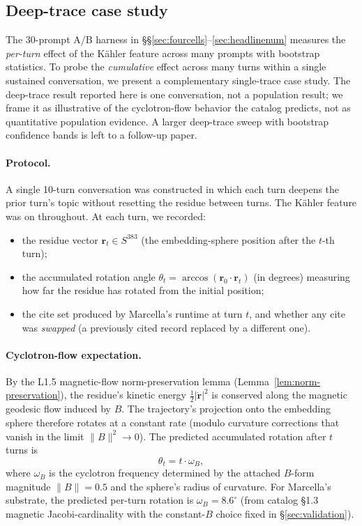 \documentclass[11pt,letterpaper]{article}
\begin{document}
\subsection{Deep-trace case study}
\label{sec:deeptrace}

The 30-prompt A/B harness in
\S\S\ref{sec:fourcells}--\ref{sec:headlinenum} measures the
\emph{per-turn} effect of the K\"ahler feature across many prompts
with bootstrap statistics. To probe the \emph{cumulative}
effect across many turns within a single sustained conversation,
we present a complementary single-trace case study. The deep-trace
result reported here is one conversation, not a population
result; we frame it as illustrative of the cyclotron-flow
behavior the catalog predicts, not as quantitative population
evidence. A larger deep-trace sweep with bootstrap confidence
bands is left to a follow-up paper.

\paragraph{Protocol.}
A single 10-turn conversation was constructed in which each turn
deepens the prior turn's topic without resetting the residue
between turns. The K\"ahler feature was on throughout. At each
turn, we recorded:
\begin{itemize}[nosep]
\item the residue vector $\mathbf{r}_t \in S^{383}$ (the
  embedding-sphere position after the $t$-th turn);
\item the accumulated rotation angle
  $\theta_t = \arccos(\mathbf{r}_0 \cdot \mathbf{r}_t)$ (in
  degrees) measuring how far the residue has rotated from the
  initial position;
\item the cite set produced by Marcella's runtime at turn $t$, and
  whether any cite was \emph{swapped} (a previously cited record
  replaced by a different one).
\end{itemize}

\paragraph{Cyclotron-flow expectation.}
By the L1.5 magnetic-flow norm-preservation lemma
(Lemma~\ref{lem:norm-preservation}), the residue's kinetic energy
$\tfrac{1}{2} |\dot{\mathbf{r}}|^2$ is conserved along the
magnetic geodesic flow induced by $B$. The trajectory's projection
onto the embedding sphere therefore rotates at a constant rate
(modulo curvature corrections that vanish in the limit
$\|B\|^2 \to 0$). The predicted accumulated rotation after $t$
turns is
\[
\theta_t = t \cdot \omega_B,
\]
where $\omega_B$ is the cyclotron frequency determined by the
attached $B$-form magnitude $\|B\| = 0.5$ and the sphere's radius
of curvature. For Marcella's substrate, the predicted per-turn
rotation is $\omega_B = 8.6^\circ$ (from catalog \S1.3 magnetic
Jacobi-cardinality with the constant-$B$ choice fixed in
\S\ref{sec:validation}).
\end{document}
